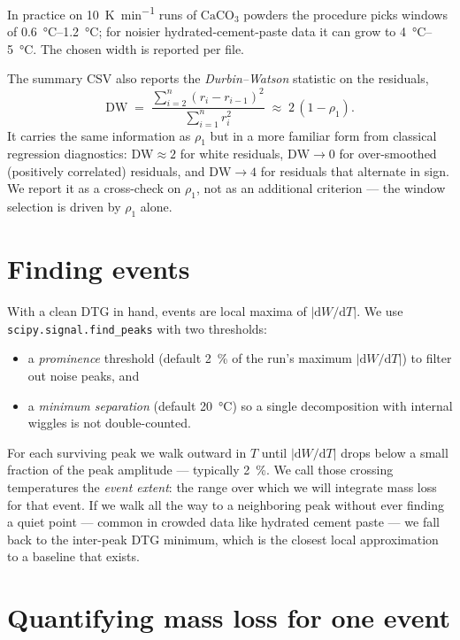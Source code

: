 \documentclass[11pt]{article}
\newcommand{\dwdT}{\mathrm{d}W/\mathrm{d}T}
\newcommand{\code}[1]{\texttt{#1}}
\begin{document}
In practice on \qty{10}{\kelvin\per\minute} runs of $\mathrm{CaCO}_3$
powders the procedure picks windows of \qtyrange{0.6}{1.2}{\celsius};
for noisier hydrated-cement-paste data it can grow to
\qtyrange{4}{5}{\celsius}.  The chosen
width is reported per file.

\medskip
\noindent
The summary CSV also reports the \emph{Durbin--Watson} statistic on
the residuals,
\[
  \mathrm{DW}
  \;=\; \frac{\sum_{i=2}^{n}(r_i - r_{i-1})^{2}}
             {\sum_{i=1}^{n} r_i^{2}}
  \;\approx\; 2\,(1 - \rho_1).
\]
It carries the same information as $\rho_1$ but in a more familiar
form from classical regression diagnostics: $\mathrm{DW} \approx 2$
for white residuals, $\mathrm{DW} \to 0$ for over-smoothed (positively
correlated) residuals, and $\mathrm{DW} \to 4$ for residuals that
alternate in sign. We report it as a cross-check on $\rho_1$, not as
an additional criterion --- the window selection is driven by $\rho_1$
alone.

\section{Finding events}

With a clean DTG in hand, events are local maxima of $|\dwdT|$. We use
\code{scipy.signal.find\_peaks} with two thresholds:
\begin{itemize}
  \item a \emph{prominence} threshold (default \qty{2}{\percent} of
        the run's maximum $|\dwdT|$) to filter out noise peaks, and
  \item a \emph{minimum separation} (default \qty{20}{\celsius}) so
        a single decomposition with internal wiggles is not
        double-counted.
\end{itemize}
For each surviving peak we walk outward in $T$ until $|\dwdT|$ drops
below a small fraction of the peak amplitude --- typically
\qty{2}{\percent}.  We
call those crossing temperatures the \emph{event extent}: the range
over which we will integrate mass loss for that event. If we walk all
the way to a neighboring peak without ever finding a quiet point ---
common in crowded data like hydrated cement paste --- we fall back to
the inter-peak DTG minimum, which is the closest local approximation
to a baseline that exists.

\section{Quantifying mass loss for one event}
\end{document}
